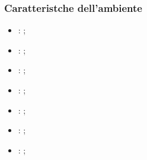 \subsubsection{Caratteristche dell'ambiente}
\fancyhead{}    %
\par{
\begin{itemize}
    \item\textbf{}: ;
    \item\textbf{}: ;
    \item\textbf{}: ;
    \item\textbf{}: ;
    \item\textbf{}: ;
    \item\textbf{}: ;
    \item\textbf{}: ;
\end{itemize}
}